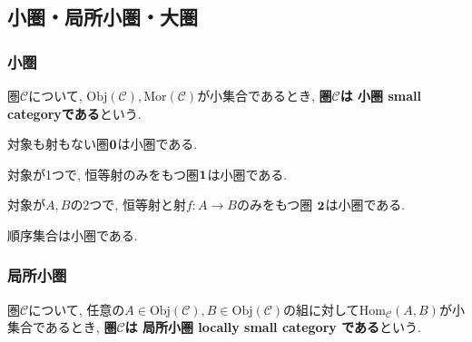 \subsection{小圏・局所小圏・大圏}
\subsubsection{小圏}
\begin{Def}
圏$\mathscr{C}$について, $\mathrm{Obj}(\mathscr{C}),\mathrm{Mor}(\mathscr{C})$が小集合であるとき,
{\bf 圏$\mathscr{C}$は
小圏 small categoryである}という.
\end{Def}
\begin{Prop}
対象も射もない圏${\bf 0}$は小圏である.
\end{Prop}
\begin{comment}
\begin{proof}
\end{proof}
\end{comment}

\begin{Prop}
対象が1つで, 恒等射のみをもつ圏${\bf 1}$は小圏である.
\end{Prop}
\begin{comment}
\begin{proof}
\end{proof}
\end{comment}

\begin{Prop}
対象が$A,B$の2つで, 
恒等射と射$f:A\rightarrow B$のみをもつ圏
${\bf 2}$は小圏である.
\end{Prop}
\begin{comment}
\begin{proof}
\end{proof}
\end{comment}

\begin{Prop}
順序集合は小圏である.
\end{Prop}
\begin{comment}
\begin{proof}
\end{proof}
\end{comment}

\subsubsection{局所小圏}
\begin{Def}
圏$\mathscr{C}$について, 任意の$A\in\mathrm{Obj}(\mathscr{C}),B\in\mathrm{Obj}(\mathscr{C})$の組に対して$\mathrm{Hom}_{\mathscr{C}}(A,B)$が小集合であるとき, 
{\bf 圏$\mathscr{C}$は 
局所小圏 locally small category 
である}という.
\end{Def}
